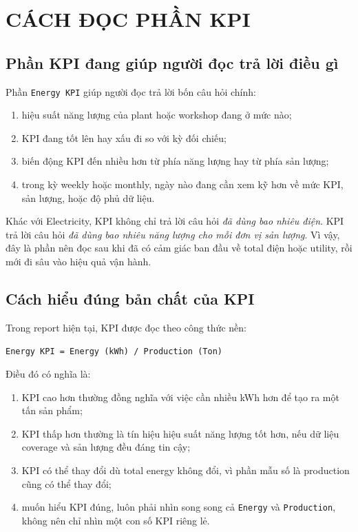 \chapter{CÁCH ĐỌC PHẦN KPI}

\section{Phần KPI đang giúp người đọc trả lời điều gì}

Phần \texttt{Energy KPI} giúp người đọc trả lời bốn câu hỏi chính:

\begin{enumerate}[label=-]
\item hiệu suất năng lượng của plant hoặc workshop đang ở mức nào;
\item KPI đang tốt lên hay xấu đi so với kỳ đối chiếu;
\item biến động KPI đến nhiều hơn từ phía năng lượng hay từ phía sản lượng;
\item trong kỳ weekly hoặc monthly, ngày nào đang cần xem kỹ hơn về mức KPI, sản lượng, hoặc độ phủ dữ liệu.
\end{enumerate}

Khác với Electricity, KPI không chỉ trả lời câu hỏi \textit{đã dùng bao nhiêu điện}. KPI trả lời câu hỏi \textit{đã dùng bao nhiêu năng lượng cho mỗi đơn vị sản lượng}. Vì vậy, đây là phần nên đọc sau khi đã có cảm giác ban đầu về total điện hoặc utility, rồi mới đi sâu vào hiệu quả vận hành.

\section{Cách hiểu đúng bản chất của KPI}

Trong report hiện tại, KPI được đọc theo công thức nền:

\begin{center}
\texttt{Energy KPI = Energy (kWh) / Production (Ton)}
\end{center}

Điều đó có nghĩa là:

\begin{enumerate}[label=-]
\item KPI cao hơn thường đồng nghĩa với việc cần nhiều kWh hơn để tạo ra một tấn sản phẩm;
\item KPI thấp hơn thường là tín hiệu hiệu suất năng lượng tốt hơn, nếu dữ liệu coverage và sản lượng đều đáng tin cậy;
\item KPI có thể thay đổi dù total energy không đổi, vì phần mẫu số là production cũng có thể thay đổi;
\item muốn hiểu KPI đúng, luôn phải nhìn song song cả \texttt{Energy} và \texttt{Production}, không nên chỉ nhìn một con số KPI riêng lẻ.
\end{enumerate}

